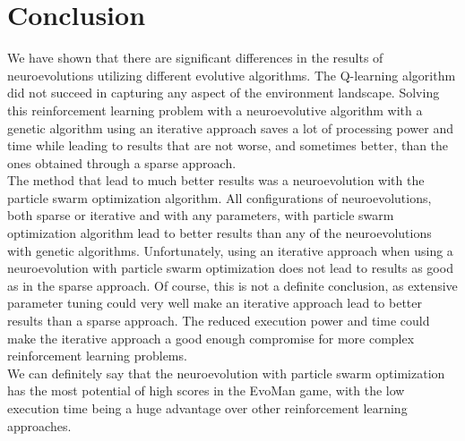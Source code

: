 \documentclass[conference]{IEEEtran}
\begin{document}
\section{Conclusion}\label{sec:conclusion}
We have shown that there are significant differences in the results of neuroevolutions utilizing different evolutive algorithms.
The Q-learning algorithm did not succeed in capturing any aspect of the environment landscape.
Solving this reinforcement learning problem with a neuroevolutive algorithm with a genetic algorithm using an
iterative approach saves a lot of processing power and time while leading to results that are not worse, and sometimes
better, than the ones obtained through a sparse approach.  \\
The method that lead to much better results was a neuroevolution with the particle swarm optimization algorithm.
All configurations of neuroevolutions, both sparse or iterative and with any parameters, with particle swarm optimization algorithm
lead to better results than any of the neuroevolutions with genetic algorithms.
Unfortunately, using an iterative approach when using a neuroevolution with particle swarm optimization does not lead
to results as good as in the sparse approach.
Of course, this is not a definite conclusion, as extensive parameter tuning could very well make an iterative approach lead
to better results than a sparse approach.
The reduced execution power and time could make the iterative approach a good enough compromise for more complex reinforcement learning problems. \\

We can definitely say that the neuroevolution with particle swarm optimization has the most potential of high scores in the EvoMan game,
with the low execution time being a huge advantage over other reinforcement learning approaches.

\newpage
\end{document}
